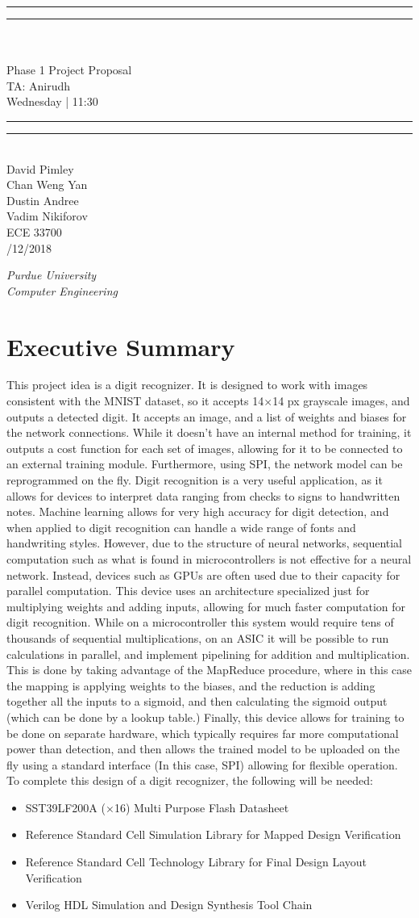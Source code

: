 \documentclass[12pt]{article}
\newcommand*{\titleGP}{\begingroup %
\centering %
\vspace*{\baselineskip} %

\rule{\textwidth}{1.6pt}\vspace*{-\baselineskip}\vspace*{2pt} %
\rule{\textwidth}{0.4pt}\\[\baselineskip] %
{\bf \fontsize{17.5pt}{12pt}\selectfont {Handwritten Digit Recognizer using Neural Networks}}\\[0.5\baselineskip] %
{\large Phase 1 Project Proposal\\
    TA: Anirudh\\[4pt]
Wednesday | 11:30}

\rule{\textwidth}{0.4pt}\vspace*{-\baselineskip}\vspace{3.2pt} %
\rule{\textwidth}{1.6pt}\\[3\baselineskip] %



{\large\sc David Pimley} %
\\[0.5\baselineskip]
{\large\sc Chan Weng Yan} %
\\[0.5\baselineskip]
{\large\sc Dustin Andree} %
\\[0.5\baselineskip]
{\large\sc Vadim Nikiforov} %
\\[3\baselineskip]
{\large\sc ECE 33700} %
\\[0.5\baselineskip]
{\large\sc 2/12/2018} %
\\\vspace{15\baselineskip}
{\itshape Purdue University\\ Computer Engineering\par} %

\vfill %

{\large }\par %

\endgroup}
\begin{document}
\pagestyle{plain}
	\titleGP
    \newpage
    \pagestyle{fancy}

    \section{Executive Summary}
    This project idea is a digit recognizer. It is designed to work with images consistent with the MNIST dataset, so it accepts 14$\times$14 px grayscale images, and outputs a detected digit. It accepts an image, and a list of weights and biases for the network connections. While it doesn't have an internal method for training, it outputs a cost function for each set of images, allowing for it to be connected to an external training module. Furthermore, using SPI, the network model can be reprogrammed on the fly. Digit recognition is a very useful application, as it allows for devices to interpret data ranging from checks to signs to handwritten notes. Machine learning allows for very high accuracy for digit detection, and when applied to digit recognition can handle a wide range of fonts and handwriting styles. However, due to the structure of neural networks, sequential computation such as what is found in microcontrollers is not effective for a neural network. Instead, devices such as GPUs are often used due to their capacity for parallel computation. This device uses an architecture specialized just for multiplying weights and adding inputs, allowing for much faster computation for digit recognition. While on a microcontroller this system would require tens of thousands of sequential multiplications, on an ASIC it will be possible to run calculations in parallel, and implement pipelining for addition and multiplication. This is done by taking advantage of the MapReduce procedure, where in this case the mapping is applying weights to the biases, and the reduction is adding together all the inputs to a sigmoid, and then calculating the sigmoid output (which can be done by a lookup table.) Finally, this device allows for training to be done on separate hardware, which typically requires far more computational power than detection, and then allows the trained model to be uploaded on the fly using a standard interface (In this case, SPI) allowing for flexible operation.\\

    To complete this design of a digit recognizer, the following will be needed:


    \begin{itemize}
        \item SST39LF200A ($\times$16) Multi Purpose Flash Datasheet
        \item Reference Standard Cell Simulation Library for Mapped Design Verification
        \item Reference Standard Cell Technology Library for Final Design Layout Verification
        \item Verilog HDL Simulation and Design Synthesis Tool Chain
    \end{itemize}
\end{document}
